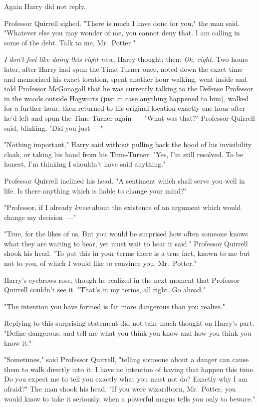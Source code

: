 Again Harry did not reply.

Professor Quirrell sighed. "There is much I have done for you," the man said.
"Whatever else you may wonder of me, you cannot deny that. I am calling in some
of the debt. Talk to me, Mr.~Potter."

\emph{I don't feel like doing this right now,} Harry thought; then: \emph{Oh,
right.}
\sbreak
Two hours later, after Harry had spun the Time-Turner once, noted down the
exact time and memorized his exact location, spent another hour walking, went
inside and told Professor McGonagall that he was currently talking to the
Defense Professor in the woods outside Hogwarts (just in case anything happened
to him), walked for a further hour, then returned to his original location
exactly one hour after he'd left and spun the Time-Turner again~---
\sbreak
"What was that?" Professor Quirrell said, blinking. "Did you just~---"

"Nothing important," Harry said without pulling back the hood of his
invisibility cloak, or taking his hand from his Time-Turner. "Yes, I'm still
resolved. To be honest, I'm thinking I shouldn't have said anything."

Professor Quirrell inclined his head. "A sentiment which shall serve you well
in life. Is there anything which is liable to change your mind?"

"Professor, if I already \emph{knew} about the existence of an argument which
would change my decision~---"

"True, for the likes of us. But you would be surprised how often someone knows
what they are waiting to hear, yet must wait to hear it said." Professor
Quirrell shook his head. "To put this in your terms{\el} there is a true
fact, known to me but not to you, of which I would like to convince you,
Mr.~Potter."

Harry's eyebrows rose, though he realized in the next moment that Professor
Quirrell couldn't see it. "That's in my terms, all right. Go ahead."

"The intention you have formed is far more dangerous than you realize."

Replying to this surprising statement did not take much thought on Harry's
part. "Define dangerous, and tell me what you think you know and how you think
you know it."

"Sometimes," said Professor Quirrell, "telling someone about a danger can cause
them to walk directly into it. I have no intention of having that happen this
time. Do you expect me to tell you exactly what you must not do? Exactly why I
am afraid?" The man shook his head. "If you were wizardborn, Mr.~Potter, you
would know to take it seriously, when a powerful magus tells you only to
beware."

